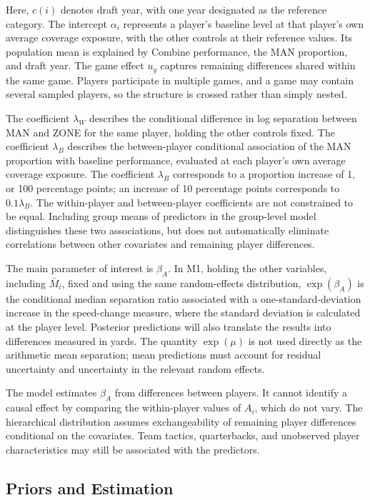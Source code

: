 \documentclass[a4paper,11pt]{article}
\begin{document}
Here, $c(i)$ denotes draft year, with one year designated as the reference category. The intercept $\alpha_i$ represents a player's baseline level at that player's own average coverage exposure, with the other controls at their reference values. Its population mean is explained by Combine performance, the MAN proportion, and draft year. The game effect $u_g$ captures remaining differences shared within the same game. Players participate in multiple games, and a game may contain several sampled players, so the structure is crossed rather than simply nested.

The coefficient $\lambda_W$ describes the conditional difference in log separation between MAN and ZONE for the same player, holding the other controls fixed. The coefficient $\lambda_B$ describes the between-player conditional association of the MAN proportion with baseline performance, evaluated at each player's own average coverage exposure. The coefficient $\lambda_B$ corresponds to a proportion increase of 1, or 100 percentage points; an increase of 10 percentage points corresponds to $0.1\lambda_B$. The within-player and between-player coefficients are not constrained to be equal. Including group means of predictors in the group-level model distinguishes these two associations, but does not automatically eliminate correlations between other covariates and remaining player differences.\cite{bafumi}

The main parameter of interest is $\beta_A$. In M1, holding the other variables, including $\bar M_i$, fixed and using the same random-effects distribution, $\exp(\beta_A)$ is the conditional median separation ratio associated with a one-standard-deviation increase in the speed-change measure, where the standard deviation is calculated at the player level. Posterior predictions will also translate the results into differences measured in yards. The quantity $\exp(\mu)$ is not used directly as the arithmetic mean separation; mean predictions must account for residual uncertainty and uncertainty in the relevant random effects.

The model estimates $\beta_A$ from differences between players. It cannot identify a causal effect by comparing the within-player values of $A_i$, which do not vary. The hierarchical distribution assumes exchangeability of remaining player differences conditional on the covariates. Team tactics, quarterbacks, and unobserved player characteristics may still be associated with the predictors.

\subsection{Priors and Estimation}
\end{document}
